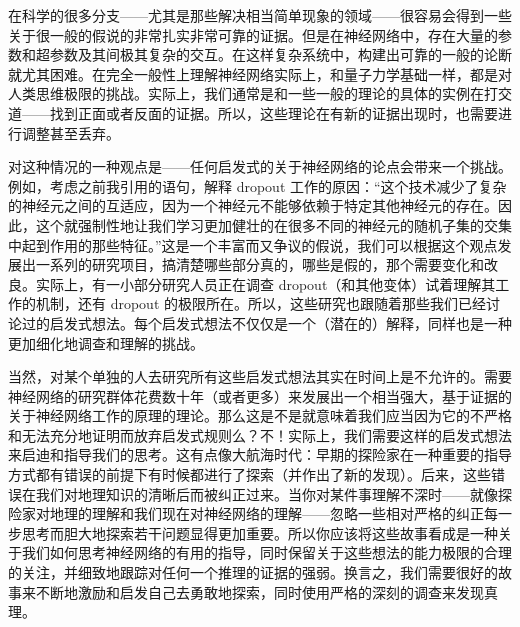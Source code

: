在科学的很多分支——尤其是那些解决相当简单现象的领域——很容易会得到一些关于很一般的假说的非常扎实非常可靠的证据。但是在神经网络中，存在大量的参数和超参数及其间极其复杂的交互。在这样复杂系统中，构建出可靠的一般的论断就尤其困难。在完全一般性上理解神经网络实际上，和量子力学基础一样，都是对人类思维极限的挑战。实际上，我们通常是和一些一般的理论的具体的实例在打交道——找到正面或者反面的证据。所以，这些理论在有新的证据出现时，也需要进行调整甚至丢弃。

对这种情况的一种观点是——任何启发式的关于神经网络的论点会带来一个挑战。例如，考虑之前我引用的语句，解释 dropout 工作的原因：“这个技术减少了复杂的神经元之间的互适应，因为一个神经元不能够依赖于特定其他神经元的存在。因此，这个就强制性地让我们学习更加健壮的在很多不同的神经元的随机子集的交集中起到作用的那些特征。”这是一个丰富而又争议的假说，我们可以根据这个观点发展出一系列的研究项目，搞清楚哪些部分真的，哪些是假的，那个需要变化和改良。实际上，有一小部分研究人员正在调查 dropout（和其他变体）试着理解其工作的机制，还有 dropout 的极限所在。所以，这些研究也跟随着那些我们已经讨论过的启发式想法。每个启发式想法不仅仅是一个（潜在的）解释，同样也是一种更加细化地调查和理解的挑战。

当然，对某个单独的人去研究所有这些启发式想法其实在时间上是不允许的。需要神经网络的研究群体花费数十年（或者更多）来发展出一个相当强大，基于证据的关于神经网络工作的原理的理论。那么这是不是就意味着我们应当因为它的不严格和无法充分地证明而放弃启发式规则么？不！实际上，我们需要这样的启发式想法来启迪和指导我们的思考。这有点像大航海时代：早期的探险家在一种重要的指导方式都有错误的前提下有时候都进行了探索（并作出了新的发现）。后来，这些错误在我们对地理知识的清晰后而被纠正过来。当你对某件事理解不深时——就像探险家对地理的理解和我们现在对神经网络的理解——忽略一些相对严格的纠正每一步思考而胆大地探索若干问题显得更加重要。所以你应该将这些故事看成是一种关于我们如何思考神经网络的有用的指导，同时保留关于这些想法的能力极限的合理的关注，并细致地跟踪对任何一个推理的证据的强弱。换言之，我们需要很好的故事来不断地激励和启发自己去勇敢地探索，同时使用严格的深刻的调查来发现真理。
